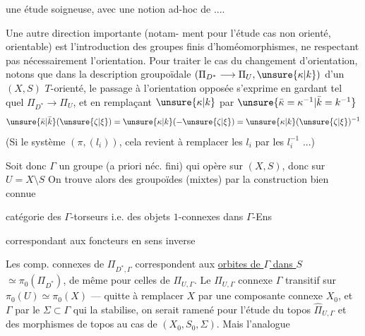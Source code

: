 
une étude soigneuse, avec une notion
ad-hoc de  ....

Une autre direction importante (notam-
ment pour l'étude  cas non orienté,
 orientable) est l'introduction des
groupes finis d'homéomorphismes, ne
respectant pas nécessairement l'orientation.
Pour traiter le cas du changement d'orientation,
notons que dans la description groupoïdale
$(\Pi_{D^*}\longrightarrow\Pi_U,\unsure{\kappa|k})$ d'un $(X,S)$ $T$-orienté,
le passage à l'orientation opposée s'exprime en
gardant tel quel $\Pi_{D^*}\longrightarrow\Pi_U$, et en
remplaçant $\unsure{\kappa|k}$ par $\unsure{\bar\kappa=\kappa^{-1}|\bar k=k^{-1}}$
\[
\unsure{\bar\kappa|\bar k}(\unsure{\zeta|\xi})=\unsure{\kappa|k}(-\unsure{\zeta|\xi})=\unsure{\kappa|k}(\unsure{\zeta|\xi})^{-1}
\]
(Si  le système $(\pi,(l_i))$, cela revient à
remplacer les $l_i$ par les $l_i^{-1}$ ...)

Soit donc $\Gamma$ un groupe (a priori
 néc. fini) qui opère sur $(X,S)$, donc
sur $U=X\setminus S$  On trouve alors des
groupoïdes  (mixtes)  par la construction bien connue


catégorie des $\Gamma$-torseurs
i.e. des objets $1$-connexes
dans $\Gamma$-Ens

correspondant aux foncteurs en sens inverse


Les comp. connexes de $\Pi_{D^*,\Gamma}$ correspondent
aux \uline{orbites de $\Gamma$ dans $S$}  $\simeq\pi_0(\Pi_{D^*})$,
de même pour celles de $\Pi_{U,\Gamma}$. Le 
$\Pi_{U,\Gamma}$ connexe 
 $\Gamma$ transitif
sur $\pi_0(U)\simeq\pi_0(X)$ --- quitte à remplacer
$X$ par une composante connexe $X_0$, et $\Gamma$
par le  $\Sigma\subset\Gamma$ qui la stabilise,
on serait ramené pour l'étude du
topos $\widehat\Pi_{U,\Gamma}$ et des morphismes de topos
au cas de $(X_0,S_0,\Sigma)$. Mais l'analogue

